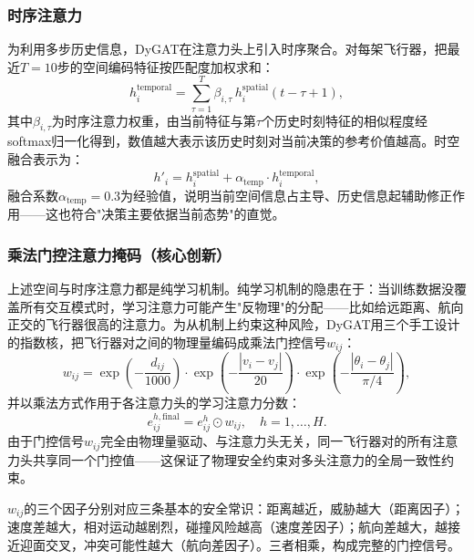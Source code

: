 \documentclass[12pt,a4paper,UTF8]{ctexart}
\begin{document}
\subsubsection{时序注意力}

为利用多步历史信息，DyGAT在注意力头上引入时序聚合。对每架飞行器，把最近$T=10$步的空间编码特征按匹配度加权求和：
\begin{equation}
    h_i^{\text{temporal}} = \sum_{\tau=1}^{T} \beta_{i,\tau}\, h_i^{\text{spatial}}(t-\tau+1),
    \label{eq:temporal_attn}
\end{equation}
其中$\beta_{i,\tau}$为时序注意力权重，由当前特征与第$\tau$个历史时刻特征的相似程度经softmax归一化得到，数值越大表示该历史时刻对当前决策的参考价值越高。时空融合表示为：
\begin{equation}
    h'_i = h_i^{\text{spatial}} + \alpha_{\text{temp}} \cdot h_i^{\text{temporal}},
    \label{eq:temporal_fusion}
\end{equation}
融合系数$\alpha_{\text{temp}}=0.3$为经验值，说明当前空间信息占主导、历史信息起辅助修正作用——这也符合"决策主要依据当前态势"的直觉。

\subsubsection{乘法门控注意力掩码（核心创新）}

上述空间与时序注意力都是纯学习机制。纯学习机制的隐患在于：当训练数据没覆盖所有交互模式时，学习注意力可能产生"反物理"的分配——比如给远距离、航向正交的飞行器很高的注意力。为从机制上约束这种风险，DyGAT用三个手工设计的指数核，把飞行器对之间的物理量编码成乘法门控信号$w_{ij}$：
\begin{equation}
    w_{ij} = \exp\!\left(-\frac{d_{ij}}{1000}\right) \cdot \exp\!\left(-\frac{|v_i - v_j|}{20}\right) \cdot \exp\!\left(-\frac{|\theta_i - \theta_j|}{\pi/4}\right),
    \label{eq:gating_w}
\end{equation}
并以乘法方式作用于各注意力头的学习注意力分数：
\begin{equation}
    e_{ij}^{h,\text{final}} = e_{ij}^{h} \odot w_{ij},\quad h=1,\ldots,H.
    \label{eq:gating_final}
\end{equation}
由于门控信号$w_{ij}$完全由物理量驱动、与注意力头无关，同一飞行器对的所有注意力头共享同一个门控值——这保证了物理安全约束对多头注意力的全局一致性约束。

$w_{ij}$的三个因子分别对应三条基本的安全常识：距离越近，威胁越大（距离因子）；速度差越大，相对运动越剧烈，碰撞风险越高（速度差因子）；航向差越大，越接近迎面交叉，冲突可能性越大（航向差因子）。三者相乘，构成完整的门控信号。
\end{document}
